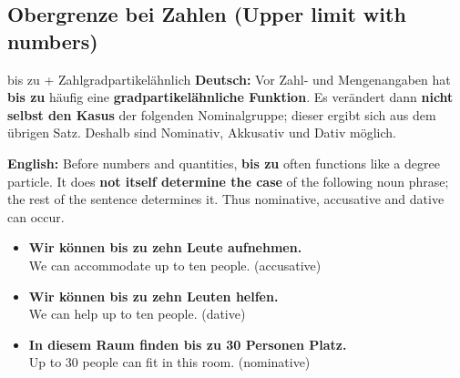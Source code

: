 \documentclass[a4paper,11pt]{article}
\newcommand{\GermanText}[1]{\textbf{Deutsch: }#1\par}
\newcommand{\EnglishText}[1]{{\small\color{SoftGray}\textbf{English: }#1\par}}
\newcommand{\ExampleItem}[2]{\item \textbf{#1}\\{\small\color{SoftGray}#2}}
\begin{document}
      \subsection{Obergrenze bei Zahlen (Upper limit with numbers)}
         \begin{grammarentry}{bis zu + Zahl}{gradpartikelähnlich}
            \GermanText{Vor Zahl- und Mengenangaben hat \textbf{bis zu} häufig eine \textbf{gradpartikelähnliche Funktion}. Es verändert dann \textbf{nicht selbst den Kasus} der folgenden Nominalgruppe; dieser ergibt sich aus dem übrigen Satz. Deshalb sind Nominativ, Akkusativ und Dativ möglich.}
            \EnglishText{Before numbers and quantities, \textbf{bis zu} often functions like a degree particle. It does \textbf{not itself determine the case} of the following noun phrase; the rest of the sentence determines it. Thus nominative, accusative and dative can occur.}
         \end{grammarentry}
         \begin{exbox}
            \begin{itemize}
               \ExampleItem{Wir können bis zu zehn Leute aufnehmen.}{We can accommodate up to ten people. (accusative)}
               \ExampleItem{Wir können bis zu zehn Leuten helfen.}{We can help up to ten people. (dative)}
               \ExampleItem{In diesem Raum finden bis zu 30 Personen Platz.}{Up to 30 people can fit in this room. (nominative)}
            \end{itemize}
         \end{exbox}
\end{document}
